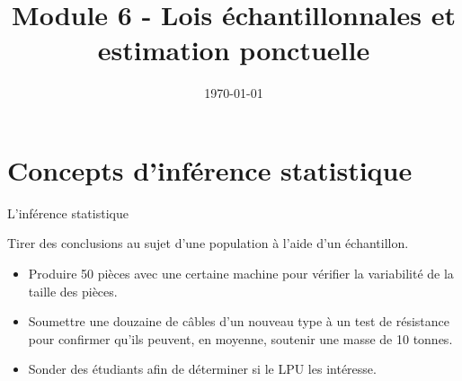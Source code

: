 \documentclass{BeamerTemplate}
\title{Module 6 - Lois échantillonnales et estimation ponctuelle}
\date{\today}
\begin{document}
\begin{frame}[t]
  \titlepage
\end{frame}








\section{Concepts d'inférence statistique}


\begin{frame}[t]{L'inférence statistique}

Tirer des conclusions au sujet d'une population à l'aide d'un échantillon.\\

\begin{itemize}\itemsep 5mm
\item<2-> Produire 50 pièces avec une certaine machine pour vérifier la variabilité de la taille des pièces.
\item<2-> Soumettre une douzaine de câbles d'un nouveau type à un test de résistance pour confirmer
qu'ils peuvent, en moyenne, soutenir une masse de 10 tonnes.
\item<2-> Sonder des étudiants afin de déterminer si le LPU les intéresse.

\end{itemize}

\vfill
{}
\end{frame}



\end{document}
